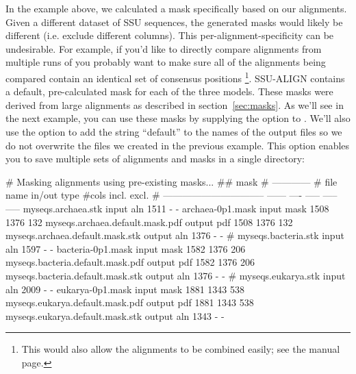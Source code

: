 In the  example above, we calculated a mask
specifically based on our  alignments. Given a different
dataset of SSU sequences, the generated masks would likely be
different (i.e. exclude different columns). This
per-alignment-specificity can be undesirable. For example, if you'd
like to directly compare alignments from multiple runs of
 you probably want to make sure all of the
alignments being compared contain an identical set of consensus
positions \footnote{This would also allow the alignments to be combined
easily; see the  manual page.}. SSU-ALIGN
contains a default, pre-calculated mask for each of the three
models. These masks were derived from large alignments as
described in section~\ref{sec:masks}. As we'll see in the next example, you
can use these masks by supplying the  option to
. We'll also use the  option to add the
string ``default'' to the names of the output files so we do not
overwrite the files we created in the previous example. This option
enables you to save multiple sets of alignments and masks in a single
directory:


\begin{sreoutput}
# Masking alignments using pre-existing masks...
##                                                            mask    
#                                                        ------------
# file name                         in/out  type  #cols  incl.  excl.
# --------------------------------  ------  ----  -----  -----  -----
  myseqs.archaea.stk                 input   aln   1511      -      -
  archaea-0p1.mask                   input  mask   1508   1376    132
  myseqs.archaea.default.mask.pdf   output   pdf   1508   1376    132
  myseqs.archaea.default.mask.stk   output   aln   1376      -      -
#
  myseqs.bacteria.stk                input   aln   1597      -      -
  bacteria-0p1.mask                  input  mask   1582   1376    206
  myseqs.bacteria.default.mask.pdf  output   pdf   1582   1376    206
  myseqs.bacteria.default.mask.stk  output   aln   1376      -      -
#
  myseqs.eukarya.stk                 input   aln   2009      -      -
  eukarya-0p1.mask                   input  mask   1881   1343    538
  myseqs.eukarya.default.mask.pdf   output   pdf   1881   1343    538
  myseqs.eukarya.default.mask.stk   output   aln   1343      -      -
\end{sreoutput}

